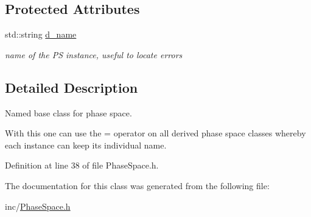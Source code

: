 \subsection*{Protected Attributes}
\begin{DoxyCompactItemize}
\item 
\hypertarget{classPS__Named_a4c24a47ba31313b51c2eed75fa441a4a}{}std\+::string \hyperlink{classPS__Named_a4c24a47ba31313b51c2eed75fa441a4a}{d\+\_\+name}\label{classPS__Named_a4c24a47ba31313b51c2eed75fa441a4a}

\begin{DoxyCompactList}\small\item\em name of the P\+S instance, useful to locate errors \end{DoxyCompactList}\end{DoxyCompactItemize}


\subsection{Detailed Description}
Named base class for phase space. 

With this one can use the \textquotesingle{}=\textquotesingle{} operator on all derived phase space classes whereby each instance can keep its individual name. 

Definition at line 38 of file Phase\+Space.\+h.



The documentation for this class was generated from the following file\+:\begin{DoxyCompactItemize}
\item 
inc/\hyperlink{PhaseSpace_8h}{Phase\+Space.\+h}\end{DoxyCompactItemize}
